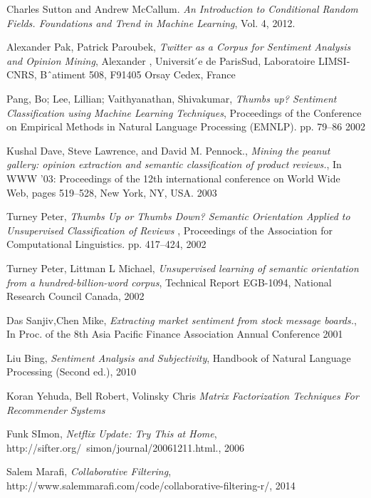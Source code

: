 \documentclass[twoside,12pt]{article}
\begin{document}
\begin{thebibliography}{9}
   Charles Sutton and Andrew McCallum.
   \emph{An Introduction to Conditional Random Fields. Foundations and Trend in Machine Learning},
   Vol. 4, 
   2012.

  Alexander Pak, Patrick Paroubek, 
  \emph{Twitter as a Corpus for Sentiment Analysis and Opinion Mining}, 
  Alexander , 
  Universit ́e de Paris­Sud, 
  Laboratoire LIMSI­CNRS, Bˆatiment 508,
  F­91405 Orsay Cedex, 
  France

  Pang, Bo; Lee, Lillian; Vaithyanathan, Shivakumar,
  \emph{Thumbs up? Sentiment Classification using Machine Learning Techniques},
  Proceedings of the Conference on Empirical Methods in Natural Language Processing (EMNLP). pp. 79–86
  2002
  
  Kushal Dave, Steve Lawrence, and David M. Pennock.,
  \emph{Mining the peanut gallery: opinion extraction and semantic classification of product reviews.},
  In WWW ’03: Proceedings of the 12th international conference on World Wide Web, pages 519–528, 
  New York, NY, 
  USA.
  2003
  
  Turney Peter,
  \emph{Thumbs Up or Thumbs Down? Semantic Orientation Applied to Unsupervised Classification of Reviews },
  Proceedings of the Association for Computational Linguistics. pp. 417–424,
  2002
  
    Turney Peter, Littman L Michael,
    \emph{Unsupervised learning of semantic orientation from a  hundred-billion-word corpus},
    Technical Report EGB-1094, National Research Council Canada,
    2002
 
  
  Das Sanjiv,Chen Mike,
  \emph{Extracting market sentiment from stock message boards.},
  In Proc. of the 8th Asia Pacific Finance Association Annual Conference
  2001
  
  Liu Bing,
  \emph{Sentiment Analysis and Subjectivity},
  Handbook of Natural Language Processing (Second ed.),
  2010
  
  
  Koran Yehuda, Bell Robert, Volinsky Chris 
  \emph{Matrix Factorization Techniques For Recommender Systems}
  
  Funk SImon, 
  \emph{Netflix Update: Try This at Home},
  http://sifter.org/~simon/journal/20061211.html.,
  2006 

  Salem Marafi, 
  \emph{Collaborative Filtering},
http://www.salemmarafi.com/code/collaborative-filtering-r/,
  2014 



\end{thebibliography}
\end{document}
